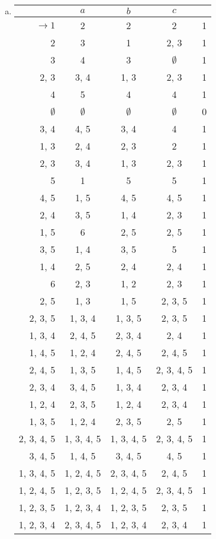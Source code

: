\begin{solution}
\begin{enumerate}[(a)]
\item\begin{tabular}[t]{r|c c c r}
    & $a$ & $b$ & $c$ &\\\hline
       $\to1$ & 2 & 2 & 2 & 1\\
       2 & 3 & 1 & 2, 3 & 1\\
       3 & 4 & 3 & $\emptyset$ & 1\\
       2, 3 & 3, 4 & 1, 3 & 2, 3 & 1\\
       4 & 5 & 4 & 4 & 1\\
       $\emptyset$ & $\emptyset$ & $\emptyset$ & $\emptyset$ & 0\\
       3, 4 & 4, 5 & 3, 4 & 4 & 1\\
       1, 3 & 2, 4 & 2, 3 & 2 & 1\\
       2, 3 & 3, 4 & 1, 3 & 2, 3 & 1\\
       5 & 1 & 5 & 5 & 1\\
       4, 5 & 1, 5 & 4, 5 & 4, 5 & 1\\
       2, 4 & 3, 5 & 1, 4 & 2, 3 & 1\\
       1, 5 &6& 2, 5 & 2, 5 & 1\\
       3, 5 & 1, 4 & 3, 5 & 5 & 1\\
       1, 4 & 2, 5 & 2, 4 & 2, 4 & 1\\
      6& 2, 3 & 1, 2 & 2, 3 & 1\\
       2, 5 & 1, 3 & 1, 5 & 2, 3, 5 & 1\\
       2, 3, 5 & 1, 3, 4 & 1, 3, 5 & 2, 3, 5 & 1\\
       1, 3, 4 & 2, 4, 5 & 2, 3, 4 & 2, 4 & 1\\
       1, 4, 5 & 1, 2, 4 & 2, 4, 5 & 2, 4, 5 & 1\\
       2, 4, 5 & 1, 3, 5 & 1, 4, 5 & 2, 3, 4, 5 & 1\\
       2, 3, 4 & 3, 4, 5 & 1, 3, 4 & 2, 3, 4 & 1\\
       1, 2, 4 & 2, 3, 5 & 1, 2, 4 & 2, 3, 4 & 1\\
       1, 3, 5 & 1, 2, 4 & 2, 3, 5 & 2, 5 & 1\\
       2, 3, 4, 5 & 1, 3, 4, 5 & 1, 3, 4, 5 & 2, 3, 4, 5 & 1\\
       3, 4, 5 & 1, 4, 5 & 3, 4, 5 & 4, 5 & 1\\
       1, 3, 4, 5 & 1, 2, 4, 5 & 2, 3, 4, 5 & 2, 4, 5 & 1\\
       1, 2, 4, 5 & 1, 2, 3, 5 & 1, 2, 4, 5 & 2, 3, 4, 5 & 1\\
       1, 2, 3, 5 & 1, 2, 3, 4 & 1, 2, 3, 5 & 2, 3, 5 & 1\\
       1, 2, 3, 4 & 2, 3, 4, 5 & 1, 2, 3, 4 & 2, 3, 4 & 1\\
   \end{tabular}
\end{enumerate}
\end{solution}

